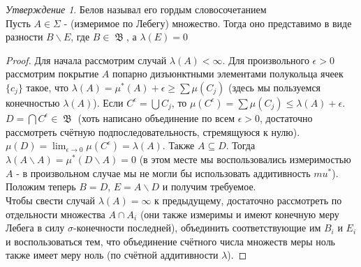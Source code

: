 \documentclass[a4paper]{article}
\theoremstyle{indented}
\theoremstyle{definition}
\theoremstyle{remark}
\newtheorem{stat}{Утверждение}
\DeclareMathOperator{\ra}{\rightarrow}
\DeclareMathOperator{\GB}{\mathfrak{B}}
\begin{document}
\begin{stat} Белов называл его гордым словосочетанием 
\\ 
Пусть $A \in \Sigma$ - (измеримое по Лебегу) множество. Тогда оно представимо в виде разности $B \backslash E$, где $B \in \GB$, а $\lambda(E)=0$
\end{stat}
\begin{proof}
Для начала рассмотрим случай $\lambda(A)< \infty$. Для произвольного $\epsilon>0$ рассмотрим покрытие $A$ попарно дизъюнктными элементами полукольца ячеек $\{c_j\}$ такое, что $\lambda(A)=\mu^*(A)+\epsilon \geq \sum \mu(C_j)$ (здесь мы пользуемся конечностью $\lambda(A)$). Если $C^{\epsilon}=\bigcup C_j$, то $\mu(C^{\epsilon})=\sum \mu(C_j) \leq \lambda(A)+\epsilon$. $D = \bigcap C^{\epsilon} \in \GB$ (хоть написано объединение по всем $\epsilon>0$, достаточно рассмотреть счётную подпоследовательность, стремящуюся к нулю). $\mu(D) = \lim_{\epsilon \ra 0} \mu(C^{\epsilon}) = \lambda(A)$. Также $A \subseteq D$. Тогда $\lambda(A \backslash A) = \mu^*(D \backslash A) = 0$ (в этом месте мы воспользовались измеримостью $A$ - в произвольном случае мы не могли бы использовать аддитивность $mu^*$). Положим теперь $B=D$, $E=A \backslash D$ и получим требуемое.
\\
Чтобы свести случай $\lambda(A)=\infty$ к предыдущему, достаточно рассмотреть по отдельности множества $A \cap A_i$ (они также измеримы и имеют конечную меру Лебега в силу $\sigma$-конечности последней), объединить соответствующие им $B_i$ и $E_i$ и воспользоваться тем, что объединение счётного числа множеств меры ноль также имеет меру ноль (по счётной аддитивности $\lambda$).
\end{proof}
\end{document}

